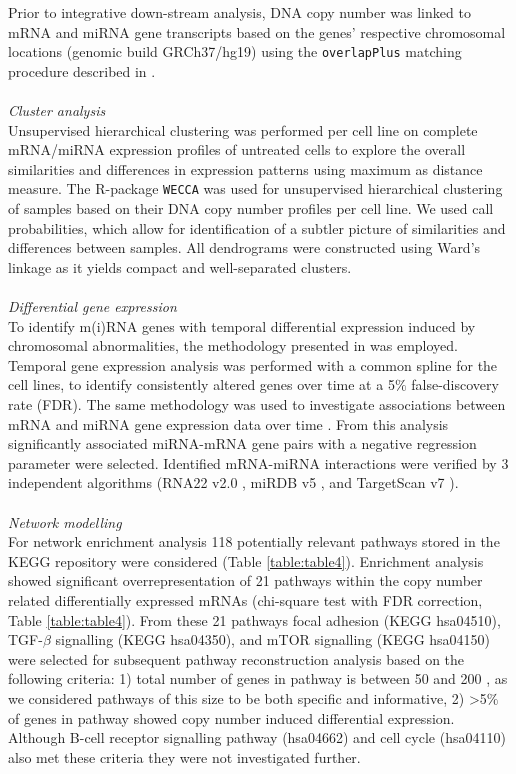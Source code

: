 Prior to integrative down-stream analysis, DNA copy number was linked to mRNA and miRNA gene transcripts based on the genes’ respective chromosomal locations (genomic build GRCh37/hg19) using the {\tt overlapPlus} matching procedure described in \cite{Wieringen2012}.
\\
\\
\textit{Cluster analysis}
\\
Unsupervised hierarchical clustering was performed per cell line on complete mRNA/miRNA expression profiles of untreated cells to explore the overall similarities and differences in expression patterns using maximum as distance measure. The R-package {\tt WECCA} \cite{Wieringen2007} was used for unsupervised hierarchical clustering of samples based on their DNA copy number profiles per cell line. We used call probabilities, which allow for identification of a subtler picture of similarities and differences between samples. All dendrograms were constructed using Ward’s linkage as it yields compact and well-separated clusters. 
\\
\\
\textit{Differential gene expression}
\\
To identify m(i)RNA genes with temporal differential expression induced by chromosomal abnormalities, the methodology presented in \cite{Miok2014} was employed. Temporal gene expression analysis was performed with a common spline for the cell lines, to identify consistently altered genes over time at a 5$\%$ false-discovery rate (FDR). The same methodology was used to investigate associations between mRNA and miRNA gene expression data over time \cite{Miok2014}. From this analysis significantly associated miRNA-mRNA gene pairs with a negative regression parameter were selected. Identified mRNA-miRNA interactions were verified by 3 independent algorithms (RNA22 v2.0 \cite{Miranda2006}, miRDB v5 \cite{Wong2015}, and TargetScan v7 \cite{Agarwal2015}). 
\\
\\
\textit{Network modelling}
\\
For network enrichment analysis 118 potentially relevant pathways stored in the KEGG repository \cite{Kanehisa2000} were considered (Table \ref{table:table4}). Enrichment analysis showed significant overrepresentation of 21 pathways within the copy number related differentially expressed mRNAs (chi-square test with FDR correction, Table \ref{table:table4}). From these 21 pathways focal adhesion (KEGG hsa04510), TGF-$\beta$ signalling (KEGG hsa04350), and mTOR signalling (KEGG hsa04150) were selected for subsequent pathway reconstruction analysis based on the following criteria: 1) total number of genes in pathway is between 50 and 200 , as we considered pathways of this size to be both specific and informative, 2) >5$\%$ of genes in pathway showed copy number induced differential expression. Although B-cell receptor signalling pathway (hsa04662) and cell cycle (hsa04110) also met these criteria they were not investigated further.


